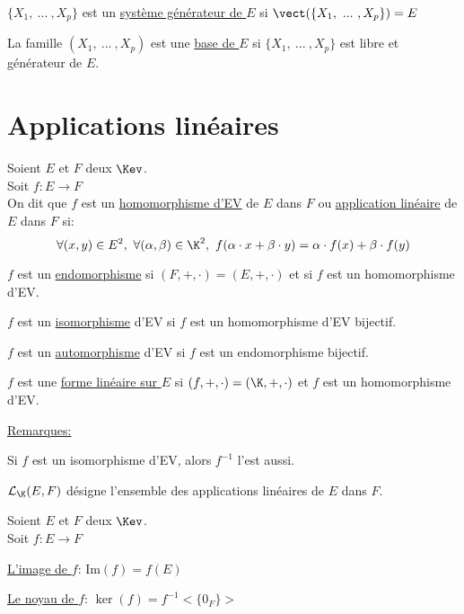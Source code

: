\documentclass[12pt,twoside,a4paper]{article}
\begin{document}
		\begin{defi}
			$\{X_1,\ ...\ ,X_p \}$ est un \underline{syst\`eme g\'en\'erateur de $E$} si $\vect(\{X_1,\ ...\ ,X_p \})=E$
		\end{defi}
		\begin{defi}
			La famille $(X_1,\ ...\ ,X_p)$ est une \underline{base de $E$} si $\{X_1,\ ...\ ,X_p\}$ est libre et g\'en\'erateur de $E$.
		\end{defi}
	\section{Applications lin\'eaires}
		\begin{defi}
			Soient $E$ et $F$ deux $\Kev$.\\
			Soit $f:E\rightarrow F$\\
			On dit que $f$ est un \underline{homomorphisme d'EV} de $E$ dans $F$ ou \underline{application lin\'eaire} de $E$ dans $F$ si:
			$$\forall (x,y)\in E^{2},\ \forall(\alpha,\beta)\in\K^{2},\ f(\alpha\cdot x+\beta\cdot y)=\alpha\cdot f(x)+\beta\cdot f(y)$$
		\end{defi}
		\newpage
		\begin{defi}
			\begin{liste}
				\item $f$ est un \underline{endomorphisme} si $(F,+,\cdot)=(E,+,\cdot)$ et si $f$ est un homomorphisme d'EV.
				\item $f$ est un \underline{isomorphisme} d'EV si $f$ est un homomorphisme d'EV bijectif.
				\item $f$ est un \underline{automorphisme} d'EV si $f$ est un endomorphisme bijectif.
				\item $f$ est une \underline{forme lin\'eaire sur $E$} si $(f,+,\cdot)=(\K,+,\cdot)$ et $f$ est un homomorphisme d'EV.
			\end{liste}
		\end{defi}
		\begin{flushleft}
			\underline{Remarques:}
			\begin{liste}
				\item Si $f$ est un isomorphisme d'EV, alors $f^{-1}$ l'est aussi.
				\item $\mathcal{L}_\K(E,F)$ d\'esigne l'ensemble des applications lin\'eaires de $E$ dans $F$.
			\end{liste}
		\end{flushleft}
		\begin{defi}
			Soient $E$ et $F$ deux $\Kev$.\\
			Soit $f:E\rightarrow F$
			\begin{liste}
				\item \underline{L'image de $f$}: $\mathrm{Im}(f)=f(E)$
				\item \underline{Le noyau de $f$}: $\ker(f)=f^{-1}<\{0_F\}>$
			\end{liste}
		\end{defi}
\end{document}
